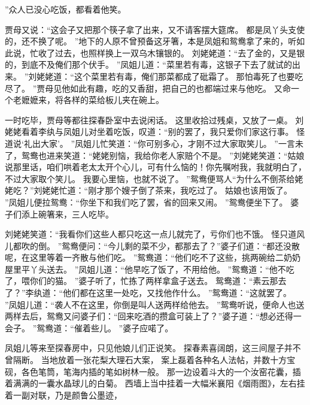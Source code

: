 ”众人已没心吃饭，都看着他笑。
\par
贾母又说：“这会子又把那个筷子拿了出来，又不请客摆大筵席。
都是凤丫头支使的，还不换了呢。
”地下的人原不曾预备这牙箸，本是凤姐和鸳鸯拿了来的，听如此说，忙收了过去，也照样换上一双乌木镶银的。
刘姥姥道：“去了金的，又是银的，到底不及俺们那个伏手。
”凤姐儿道：“菜里若有毒，这银子下去了就试的出来。
”刘姥姥道：“这个菜里若有毒，俺们那菜都成了砒霜了。
那怕毒死了也要吃尽了。
”贾母见他如此有趣，吃的又香甜，把自己的也都端过来与他吃。
又命一个老嬷嬷来，将各样的菜给板儿夹在碗上。
\par
一时吃毕，贾母等都往探春卧室中去说闲话。
这里收拾过残桌，又放了一桌。
刘姥姥看着李纨与凤姐儿对坐着吃饭，叹道：“别的罢了，我只爱你们家这行事。
怪道说‘礼出大家’。
”凤姐儿忙笑道：“你可别多心，才刚不过大家取笑儿。
”一言未了，鸳鸯也进来笑道：“姥姥别恼，我给你老人家赔个不是。
”刘姥姥笑道：“姑娘说那里话，咱们哄着老太太开个心儿，可有什么恼的！你先嘱咐我，我就明白了，不过大家取个笑儿。
我要心里恼，也就不说了。
”鸳鸯便骂人“为什么不倒茶给姥姥吃？”刘姥姥忙道：“刚才那个嫂子倒了茶来，我吃过了。
姑娘也该用饭了。
”凤姐儿便拉鸳鸯：“你坐下和我们吃了罢，省的回来又闹。
”鸳鸯便坐下了。
婆子们添上碗箸来，三人吃毕。
\par
刘姥姥笑道：“我看你们这些人都只吃这一点儿就完了，亏你们也不饿。
怪只道风儿都吹的倒。
”鸳鸯便问：“今儿剩的菜不少，都那去了？”婆子们道：“都还没散呢，在这里等着一齐散与他们吃。
”鸳鸯道：“他们吃不了这些，挑两碗给二奶奶屋里平丫头送去。
”凤姐儿道：“他早吃了饭了，不用给他。
”鸳鸯道：“他不吃了，喂你们的猫。
”婆子听了，忙拣了两样拿盒子送去。
鸳鸯道：“素云那去了？”李纨道：“他们都在这里一处吃，又找他作什么。
”鸳鸯道：“这就罢了。
”凤姐儿道：“袭人不在这里，你倒是叫人送两样给他去。
”鸳鸯听说，便命人也送两样去后，鸳鸯又问婆子们：“回来吃酒的攒盒可装上了？”婆子道：“想必还得一会子。
”鸳鸯道：“催着些儿。
”婆子应喏了。
\par
凤姐儿等来至探春房中，只见他娘儿们正说笑。
探春素喜阔朗，这三间屋子并不曾隔断。
当地放着一张花梨大理石大案，
案上磊着各种名人法帖，并数十方宝砚，各色笔筒，笔海内插的笔如树林一般。
那一边设着斗大的一个汝窑花囊，插着满满的一囊水晶球儿的白菊。
西墙上当中挂着一大幅米襄阳《烟雨图》，左右挂着一副对联，乃是颜鲁公墨迹，
